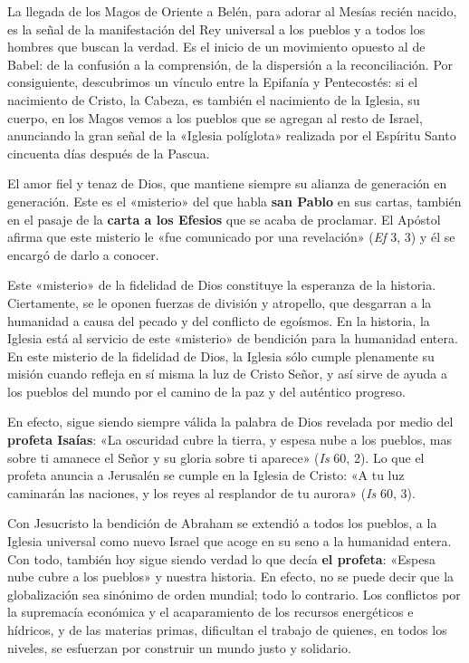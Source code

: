 \documentclass[]{article}
\begin{document}
La llegada de los Magos de Oriente a Belén, para adorar al Mesías recién
nacido, es la señal de la manifestación del Rey universal a los pueblos
y a todos los hombres que buscan la verdad. Es el inicio de un
movimiento opuesto al de Babel: de la confusión a la comprensión, de la
dispersión a la reconciliación. Por consiguiente, descubrimos un vínculo
entre la Epifanía y Pentecostés: si el nacimiento de Cristo, la Cabeza,
es también el nacimiento de la Iglesia, su cuerpo, en los Magos vemos a
los pueblos que se agregan al resto de Israel, anunciando la gran señal
de la «Iglesia políglota» realizada por el Espíritu Santo cincuenta días
después de la Pascua.

El amor fiel y tenaz de Dios, que mantiene siempre su alianza de
generación en generación. Este es el «misterio» del que habla
\textbf{san Pablo} en sus cartas, también en el pasaje de la
\textbf{carta a los Efesios} que se acaba de proclamar. El Apóstol
afirma que este misterio le «fue comunicado por una revelación»
(\emph{Ef} 3, 3) y él se encargó de darlo a conocer.

Este «misterio» de la fidelidad de Dios constituye la esperanza de la
historia. Ciertamente, se le oponen fuerzas de división y atropello, que
desgarran a la humanidad a causa del pecado y del conflicto de egoísmos.
En la historia, la Iglesia está al servicio de este «misterio» de
bendición para la humanidad entera. En este misterio de la fidelidad de
Dios, la Iglesia sólo cumple plenamente su misión cuando refleja en sí
misma la luz de Cristo Señor, y así sirve de ayuda a los pueblos del
mundo por el camino de la paz y del auténtico progreso.

En efecto, sigue siendo siempre válida la palabra de Dios revelada por
medio del \textbf{profeta Isaías}: «La oscuridad cubre la tierra, y
espesa nube a los pueblos, mas sobre ti amanece el Señor y su gloria
sobre ti aparece» (\emph{Is} 60, 2). Lo que el profeta anuncia a
Jerusalén se cumple en la Iglesia de Cristo: «A tu luz caminarán las
naciones, y los reyes al resplandor de tu aurora» (\emph{Is} 60, 3).

Con Jesucristo la bendición de Abraham se extendió a todos los pueblos,
a la Iglesia universal como nuevo Israel que acoge en su seno a la
humanidad entera. Con todo, también hoy sigue siendo verdad lo que decía
\textbf{el profeta}: «Espesa nube cubre a los pueblos» y nuestra
historia. En efecto, no se puede decir que la globalización sea sinónimo
de orden mundial; todo lo contrario. Los conflictos por la supremacía
económica y el acaparamiento de los recursos energéticos e hídricos, y
de las materias primas, dificultan el trabajo de quienes, en todos los
niveles, se esfuerzan por construir un mundo justo y solidario.
\end{document}
